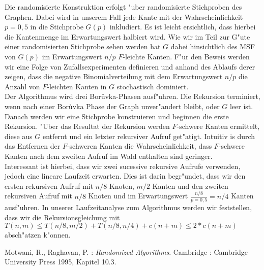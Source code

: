 \documentclass[a4paper,12pt,times,german]{cls/summary}
\begin{document}
Die randomisierte Konstruktion erfolgt "uber randomisierte Stichproben 
    des Graphen.
    Dabei wird in unserem Fall jede Kante mit der Wahrscheinlichkeit $p=0,5$
    in die Stichprobe $G(p)$ inkludiert. 
    Es ist leicht ersichtlich, dass hierbei die Kantenmenge im Erwartungswert
    halbiert wird.
    Wie wir im Teil zur G"ute einer randomisierten Stichprobe sehen werden 
    hat $G$ dabei hinsichtlich des MSF von $G(p)$ im Erwartungswert $n/p$
    $F$-leichte Kanten. 
    F"ur den Beweis werden wir eine Folge von Zufallsexperimenten definieren
    und anhand des Ablaufs derer zeigen, dass die negative Binomialverteilung
    mit dem Erwartungswert $n/p$ die Anzahl von $F$-leichten Kanten in $G$
    stochastisch dominiert.\\
Der Algorithmus wird drei Bor\r uvka-Phasen ausf"uhren.
    Die Rekursion terminiert, wenn nach einer Bor\r uvka Phase der Graph 
    unver"andert bleibt, oder $G$ leer ist.
    Danach werden wir eine Stichprobe konstruieren und beginnen die erste
    Rekursion.
    "Uber das Resultat der Rekursion werden $F$-schwere Kanten ermittelt, 
    diese aus $G$ entfernt und ein letzter rekursiver Aufruf get"atigt.
    Intuitiv is durch das Entfernen der $F$-schweren Kanten die 
    Wahrscheinlichkeit, dass $F$-schwere Kanten nach dem zweiten Aufruf im 
    Wald enthalten sind geringer.\\
Interessant ist hierbei, dass wir zwei sucessive rekursive Aufrufe verwenden, jedoch
    eine lineare Laufzeit erwarten.
    Dies ist darin begr"undet, dass wir den ersten rekursiven Aufruf mit 
    $n/8$ Knoten, $m/2$ Kanten und den zweiten rekursiven Aufruf mit $n/8$ Knoten
    und im Erwartungswert
    $\frac{n/8}{p=0,5} = n/4$ Kanten ausf"uhren.
    In unserer Laufzeitanalyse zum Algorithmus werden wir feststellen, dass
    wir die Rekursionsgleichung mit 
    $T(n,m) \leq T(n/8,m/2) + T(n/8, n/4) + c(n+m) \leq 2*c(n+m)$
    absch"atzen k"onnen.\\

\begin{thebibliography}{}
\footnotesize
{} 
    Motwani, R., Raghavan, P. :
    \textit{Randomized Algorithms}. Cambridge :
    Cambridge University Press 1995, Kapitel 10.3.
\end{thebibliography}
\end{document}
